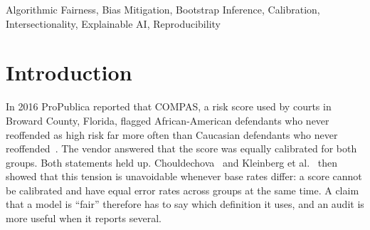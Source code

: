 \documentclass[conference]{IEEEtran}
\begin{document}
\begin{abstract}
FairLens is an open-source tool for auditing binary classifiers on tabular data for group bias. Given a dataset, a model and a protected attribute, it reports four fairness gaps (demographic parity, equalized odds, equal opportunity and predictive parity) with bootstrap intervals, ranks proxy features by mutual information, runs Reweighing, Exponentiated Gradient and Threshold Optimizer, and explains single predictions with SHAP and DiCE. None of these algorithms is ours. What we contribute is the plumbing around them (leakage removal, significance testing, tolerance tuning and label handling), which in our experience is where audits quietly go wrong. Results are reported for German Credit, COMPAS and Adult Income, each over ten random splits. Threshold Optimizer and Exponentiated Gradient lowered the COMPAS demographic parity gap by 0.216 and 0.208 respectively, both significant under a paired bootstrap, although Exponentiated Gradient gave up 8.4 accuracy points to do it against 2.3 for Threshold Optimizer. On Adult Income the same two methods closed the parity gap and opened up the equalized odds gap. The COMPAS baseline was about as well calibrated for African-American defendants as for Caucasian defendants (ECE 0.027 vs.\ 0.029) while selecting them at rates 0.24 apart, and its race$\times$sex gap of 0.368 exceeded both single-attribute gaps. We also list seven bugs from our own first implementation; one of them inflated a reported disparity by a factor of 2.9.
\end{abstract}

\begin{IEEEkeywords}
Algorithmic Fairness, Bias Mitigation, Bootstrap Inference, Calibration, Intersectionality, Explainable AI, Reproducibility
\end{IEEEkeywords}

\section{Introduction}\label{sec:intro}
In 2016 ProPublica reported that COMPAS, a risk score used by courts in Broward County, Florida, flagged African-American defendants who never reoffended as high risk far more often than Caucasian defendants who never reoffended~\cite{angwin2016machine}. The vendor answered that the score was equally calibrated for both groups. Both statements held up. Chouldechova~\cite{chouldechova2017fair} and Kleinberg et al.~\cite{kleinberg2017inherent} then showed that this tension is unavoidable whenever base rates differ: a score cannot be calibrated and have equal error rates across groups at the same time. A claim that a model is ``fair'' therefore has to say which definition it uses, and an audit is more useful when it reports several.
\end{document}
